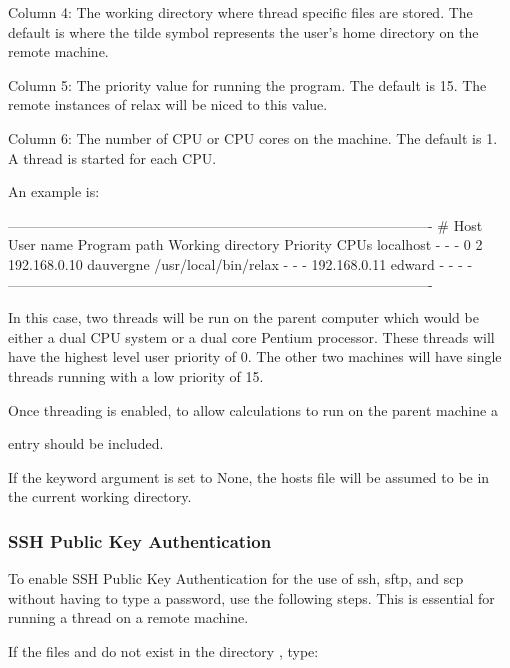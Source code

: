 Column 4:  The working directory where thread specific files are stored.  The default is
 where the tilde 
 symbol represents the user's home directory on the remote
machine.

Column 5:  The priority value for running the program.  The default is 15.  The remote
instances of relax will be niced to this value.

Column 6:  The number of CPU or CPU cores on the machine.  The default is 1.  A thread is
started for each CPU.

An example is:

-------------------------------------------------------------------------------------------
\# Host          User name       Program path            Working directory    Priority  CPUs
localhost       -               -                       -                    0         2
192.168.0.10    dauvergne       /usr/local/bin/relax    -                    -         -
192.168.0.11    edward          -                       -                    -         -
-------------------------------------------------------------------------------------------

In this case, two threads will be run on the parent computer which would be either a dual
CPU system or a dual core 
 Pentium processor.  These threads will have the
highest level user priority of 0.  The other two machines will have single threads running
with a low priority of 15.

Once threading is enabled, to allow calculations to run on the parent machine a 

entry should be included.


If the keyword argument 
 is set to None, the hosts file will be assumed to be in the
current working directory.


\subsubsection{SSH Public Key Authentication}

To enable SSH Public Key Authentication for the use of ssh, sftp, and scp without having to
type a password, use the following steps.  This is essential for running a thread on a
remote machine.

If the files 
 and 
 do not exist in the directory 
, type:

